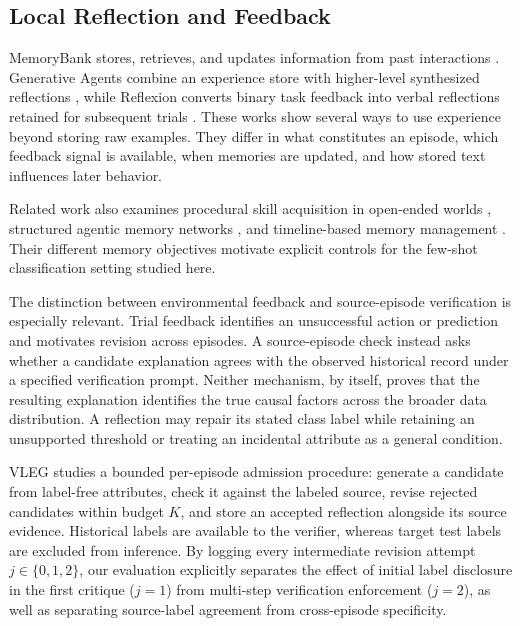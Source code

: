 \documentclass[10pt,a4paper,onecolumn]{article}
\theoremstyle{definition}
\theoremstyle{remark}
\begin{document}
\subsection{Local Reflection and Feedback}
MemoryBank stores, retrieves, and updates information from past interactions \cite{zhong2024memorybank}. Generative Agents combine an experience store with higher-level synthesized reflections \cite{park2023generative}, while Reflexion converts binary task feedback into verbal reflections retained for subsequent trials \cite{shinn2023reflexion}. These works show several ways to use experience beyond storing raw examples. They differ in what constitutes an episode, which feedback signal is available, when memories are updated, and how stored text influences later behavior.

Related work also examines procedural skill acquisition in open-ended worlds \cite{wang2024voyager}, structured agentic memory networks \cite{xu2025amem}, and timeline-based memory management \cite{kim2024towards}. Their different memory objectives motivate explicit controls for the few-shot classification setting studied here.

The distinction between environmental feedback and source-episode verification is especially relevant. Trial feedback identifies an unsuccessful action or prediction and motivates revision across episodes. A source-episode check instead asks whether a candidate explanation agrees with the observed historical record under a specified verification prompt. Neither mechanism, by itself, proves that the resulting explanation identifies the true causal factors across the broader data distribution. A reflection may repair its stated class label while retaining an unsupported threshold or treating an incidental attribute as a general condition.

VLEG studies a bounded per-episode admission procedure: generate a candidate from label-free attributes, check it against the labeled source, revise rejected candidates within budget $K$, and store an accepted reflection alongside its source evidence. Historical labels are available to the verifier, whereas target test labels are excluded from inference. By logging every intermediate revision attempt $j \in \{0, 1, 2\}$, our evaluation explicitly separates the effect of initial label disclosure in the first critique ($j=1$) from multi-step verification enforcement ($j=2$), as well as separating source-label agreement from cross-episode specificity.
\end{document}
